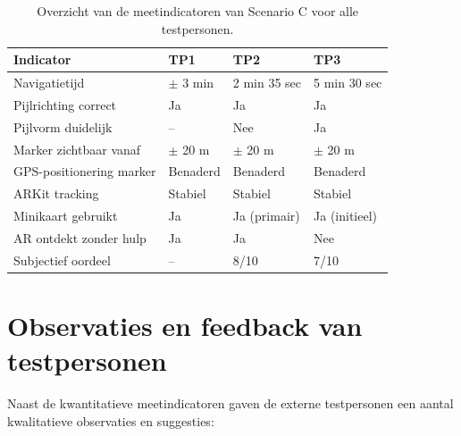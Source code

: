 \begin{table}[h]
    \centering
    \caption[Overzicht testresultaten Scenario C]{Overzicht van de meetindicatoren
        van Scenario C voor alle testpersonen.}
    \label{tab:testresultaten}
    \renewcommand{\arraystretch}{1.4}
    \begin{tabular}{p{4cm} p{3cm} p{3cm} p{3cm}}
        \hline
        \textbf{Indicator} & \textbf{TP1} & \textbf{TP2} & \textbf{TP3} \\
        \hline
        Navigatietijd & $\pm$ 3 min & 2 min 35 sec & 5 min 30 sec \\
        \hline
        Pijlrichting correct & Ja & Ja & Ja \\
        \hline
        Pijlvorm duidelijk & -- & Nee & Ja \\
        \hline
        Marker zichtbaar vanaf & $\pm$ 20 m & $\pm$ 20 m & $\pm$ 20 m \\
        \hline
        GPS-positionering marker & Benaderd & Benaderd & Benaderd \\
        \hline
        ARKit tracking & Stabiel & Stabiel & Stabiel \\
        \hline
        Minikaart gebruikt & Ja & Ja (primair) & Ja (initieel) \\
        \hline
        AR ontdekt zonder hulp & Ja & Ja & Nee \\
        \hline
        Subjectief oordeel & -- & 8/10 & 7/10 \\
        \hline
    \end{tabular}
\end{table}

\section{Observaties en feedback van testpersonen}

Naast de kwantitatieve meetindicatoren gaven de externe testpersonen een aantal
kwalitatieve observaties en suggesties:


